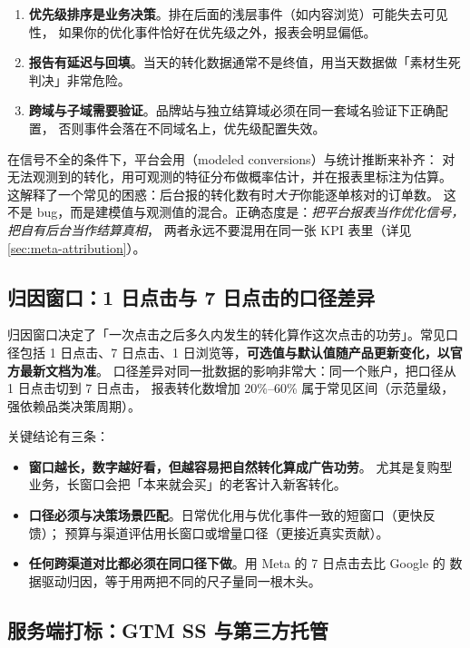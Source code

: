 \begin{enumerate}
  \item \textbf{优先级排序是业务决策}。排在后面的浅层事件（如内容浏览）可能失去可见性，
        如果你的优化事件恰好在优先级之外，报表会明显偏低。
  \item \textbf{报告有延迟与回填}。当天的转化数据通常不是终值，用当天数据做「素材生死判决」非常危险。
  \item \textbf{跨域与子域需要验证}。品牌站与独立结算域必须在同一套域名验证下正确配置，
        否则事件会落在不同域名上，优先级配置失效。
\end{enumerate}

在信号不全的条件下，平台会用（modeled conversions）与统计推断来补齐：
对无法观测到的转化，用可观测的特征分布做概率估计，并在报表里标注为估算。
这解释了一个常见的困惑：后台报的转化数有时\emph{大于}你能逐单核对的订单数。
这不是 bug，而是建模值与观测值的混合。正确态度是：\emph{把平台报表当作优化信号，把自有后台当作结算真相}，
两者永远不要混用在同一张 KPI 表里（详见 \cref{sec:meta-attribution}）。

\subsection{归因窗口：1 日点击与 7 日点击的口径差异}

归因窗口决定了「一次点击之后多久内发生的转化算作这次点击的功劳」。常见口径包括
1 日点击、7 日点击、1 日浏览等，\textbf{可选值与默认值随产品更新变化，以官方最新文档为准}。
口径差异对同一批数据的影响非常大：同一个账户，把口径从 1 日点击切到 7 日点击，
报表转化数增加 20\%--60\% 属于常见区间（示范量级，强依赖品类决策周期）。

关键结论有三条：
\begin{itemize}
  \item \textbf{窗口越长，数字越好看，但越容易把自然转化算成广告功劳}。
        尤其是复购型业务，长窗口会把「本来就会买」的老客计入新客转化。
  \item \textbf{口径必须与决策场景匹配}。日常优化用与优化事件一致的短窗口（更快反馈）；
        预算与渠道评估用长窗口或增量口径（更接近真实贡献）。
  \item \textbf{任何跨渠道对比都必须在同口径下做}。用 Meta 的 7 日点击去比 Google 的
        数据驱动归因，等于用两把不同的尺子量同一根木头。
\end{itemize}

\subsection{服务端打标：GTM SS 与第三方托管}


